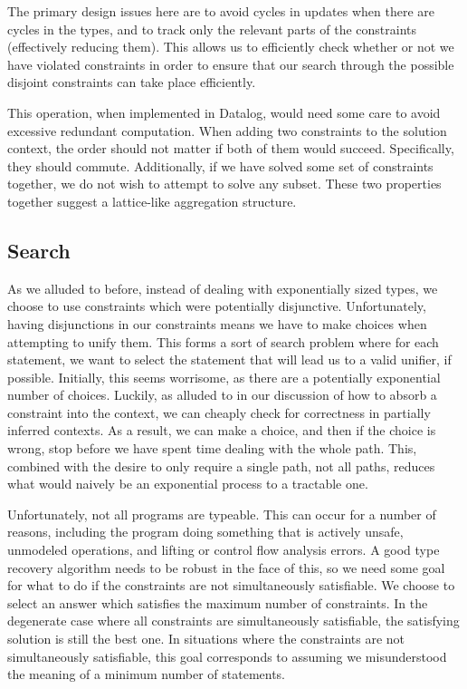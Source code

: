 The primary design issues here are to avoid cycles in updates when there are cycles in the types, and to track only the relevant parts of the constraints (effectively reducing them). This allows us to efficiently check whether or not we have violated constraints in order to ensure that our search through the possible disjoint constraints can take place efficiently.

This operation, when implemented in Datalog, would need some care to avoid excessive redundant computation.
When adding two constraints to the solution context, the order should not matter if both of them would succeed.
Specifically, they should commute.
Additionally, if we have solved some set of constraints together, we do not wish to attempt to solve any subset.
These two properties together suggest a lattice-like aggregation structure.

\subsection{Search}
As we alluded to before, instead of dealing with exponentially sized types, we choose to use constraints which were potentially disjunctive. Unfortunately, having disjunctions in our constraints means we have to make choices when attempting to unify them. This forms a sort of search problem where for each statement, we want to select the statement that will lead us to a valid unifier, if possible. Initially, this seems worrisome, as there are a potentially exponential number of choices. Luckily, as alluded to in our discussion of how to absorb a constraint into the context, we can cheaply check for correctness in partially inferred contexts. As a result, we can make a choice, and then if the choice is wrong, stop before we have spent time dealing with the whole path. This, combined with the desire to only require a single path, not all paths, reduces what would naively be an exponential process to a tractable one.

Unfortunately, not all programs are typeable. This can occur for a number of reasons, including the program doing something that is actively unsafe, unmodeled operations, and lifting or control flow analysis errors. A good type recovery algorithm needs to be robust in the face of this, so we need some goal for what to do if the constraints are not simultaneously satisfiable. We choose to select an answer which satisfies the maximum number of constraints. In the degenerate case where all constraints are simultaneously satisfiable, the satisfying solution is still the best one.
In situations where the constraints are not simultaneously satisfiable, this goal corresponds to assuming we misunderstood the meaning of a minimum number of statements.

